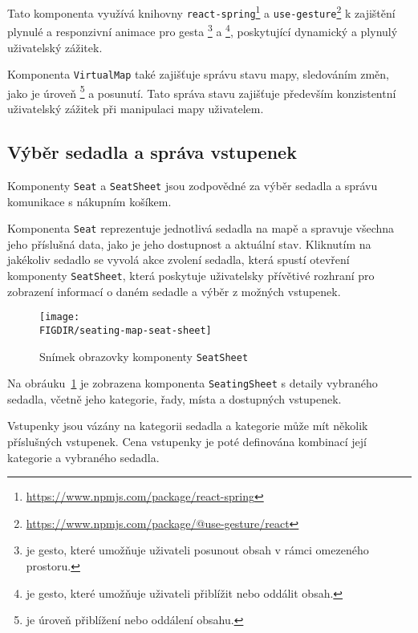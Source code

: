 Tato komponenta využívá knihovny \texttt{react-spring}\footnote{\url{https://www.npmjs.com/package/react-spring}} a \texttt{use-gesture}\footnote{\url{https://www.npmjs.com/package/@use-gesture/react}} k zajištění plynulé a responzivní animace pro gesta \footnote{ je gesto, které umožňuje uživateli posunout obsah v rámci omezeného prostoru.} a \footnote{ je gesto, které umožňuje uživateli přiblížit nebo oddálit obsah.
}, poskytující dynamický a plynulý uživatelský zážitek.

Komponenta \texttt{VirtualMap} také zajišťuje správu stavu mapy, sledováním změn, jako je úroveň \footnote{ je úroveň přiblížení nebo oddálení obsahu.} a posunutí.
Tato správa stavu zajišťuje především konzistentní uživatelský zážitek při manipulaci mapy uživatelem.

\subsection{Výběr sedadla a správa vstupenek}
\label{subsec:implementace-seating-seat}
Komponenty \texttt{Seat} a \texttt{SeatSheet} jsou zodpovědné za výběr sedadla a správu komunikace s nákupním košíkem.

Komponenta \texttt{Seat} reprezentuje jednotlivá sedadla na mapě a spravuje všechna jeho příslušná data, jako je jeho dostupnost a aktuální stav.
Kliknutím na jakékoliv sedadlo se vyvolá akce zvolení sedadla, která spustí otevření komponenty \texttt{SeatSheet}, která poskytuje uživatelsky přívětivé rozhraní pro zobrazení informací o daném sedadle a výběr z možných vstupenek.

\begin{figure}[h]
	\centering
	\texttt{[image: \\FIGDIR/seating-map-seat-sheet]}
	\caption{Snímek obrazovky komponenty \texttt{SeatSheet}}
	\label{fig:seating-map-seats-sheet}
\end{figure}

Na obráuku~\ref{fig:seating-map-seats-sheet} je zobrazena komponenta \texttt{SeatingSheet} s detaily vybraného sedadla, včetně jeho kategorie, řady, místa a dostupných vstupenek.

Vstupenky jsou vázány na kategorii sedadla a kategorie může mít několik příslušných vstupenek.
Cena vstupenky je poté definována kombinací její kategorie a vybraného sedadla.

